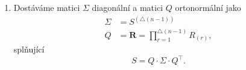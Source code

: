 \begin{enumerate}[label=(\roman*)]
\begin{enumerate}[label=(\alph*)]
\[\begin{pNiceMatrix}
				             & \Vdots &        &   &        & \Vdots             &        &        & \Ddots &        &        & \Vdots              &        &   &        &        & \\
				             &        &        &   &        &                    &        &        &        & 1      &        &                     &        &   &        &        & \\
				             &        &        &   &        &                    &        &        &        &        & \Ddots &                     &        &   &        &        & \\
				             &        &        &   &        & \sin(\theta^{(r)}) &        & \Cdots &        & \Cdots &        & \cos(\theta^{(r)})  &        &   &        &        & \\
				             &        &        &   &        &                    &        &        &        &        &        &                     & \Ddots &   &        &        & \\
				             &        &        &   &        &                    &        &        &        &        &        &                     &        & 1 &        &        & \\
				             &        &        &   &        &                    &        &        &        &        &        &                     &        &   & \Ddots &        & \\
				             & 0      & \Cdots &   &        &                    &        &        &        &        &        &                     &        &   &        & 1      & \\
			            \end{pNiceMatrix}.
		            \]
		      \item
		            \[
			            \mathscr{I}_{r}: \tilde{S}^{(r-1)} \mapsto \tilde{S}^{(r)} = R_{(r)}^{\top}\cdot \tilde{S}^{(r-1)} \cdot R_{(r)}.
		            \]
	      \end{enumerate}
	\item Dostáváme matici $\Sigma$ diagonální a matici $Q$ ortonormální jako
	      \begin{align*}
		      \Sigma & = S^{\left(\triangle(n-1)\right)}                        \\
		      Q      & = \boldsymbol{R} = \prod_{r=1}^{\triangle(n-1)} R_{(r)},
	      \end{align*}
	      splňující
	      \[
		      S = Q\cdot\Sigma\cdot Q^{\top}
		      .\]
\end{enumerate}

